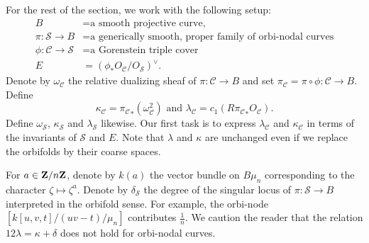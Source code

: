 \documentclass{amsart}
\newcommand {\Z}{{\bf Z}}
\newcommand {\from}{{\colon}}
\newcommand{\orb}[1]{{\mathcal #1}}     %
\newcommand{\dual}[1]{#1^{\vee}}
\begin{document}
For the rest of the section, we work with the following setup:
\begin{equation}\label{eq:calculation_setup}
  \begin{split}
  B &= \text{a smooth projective curve,}\\
  \pi \from \orb S \to B &= \text{a generically smooth, proper family     of orbi-nodal curves}\\
\phi \from \orb C \to \orb S &= \text{a Gorenstein triple cover}\\
E &= \dual{(\phi_* O_{\orb C}/O_{\orb S})}.
\end{split}
\end{equation}
Denote by $\omega_{\orb C}$ the relative dualizing sheaf of $\pi \from \orb C \to B$ and set $\pi_{\orb C} = \pi \circ \phi \from \orb C \to B$. Define
\[ \kappa_{\orb C} = {\pi_{\orb C}}_*(\omega_{\orb C}^2) \text{ and } \lambda_{\orb C} = c_1(R{\pi_{\orb C}}_* O_{\orb C}).\]
Define $\omega_{\orb S}$, $\kappa_{\orb S}$ and $\lambda_{\orb S}$ likewise. Our first task is to express $\lambda_{\orb C}$ and $\kappa_{\orb C}$ in terms of the invariants of $\orb S$ and $E$. Note that $\lambda$ and $\kappa$ are unchanged even if we replace the orbifolds by their coarse spaces.

For $a \in \Z/n\Z$, denote by $k(a)$ the vector bundle on $B\mu_n$ corresponding to the character $\zeta \mapsto \zeta^a$. Denote by $\delta_{\orb S}$ the degree of the singular locus of $\pi \from \orb S \to B$ interpreted in the orbifold sense. For example, the orbi-node $[k[u,v,t]/(uv-t)/\mu_n]$ contributes $\frac{1}{n}$. We caution the reader that the relation $12\lambda = \kappa + \delta$ does not hold for orbi-nodal curves.
\end{document}
